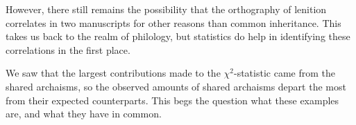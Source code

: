However, there still remains the possibility that the orthography of lenition correlates in two manuscripts for other reasons than common inheritance. This takes us back to the realm of philology, but statistics do help in identifying these correlations in the first place.

We saw that the largest contributions made to the \(\chi^2\)-statistic came from the shared archaisms, so the observed amounts of shared archaisms depart the most from their expected counterparts. This begs the question what these examples are, and what they have in common. 




